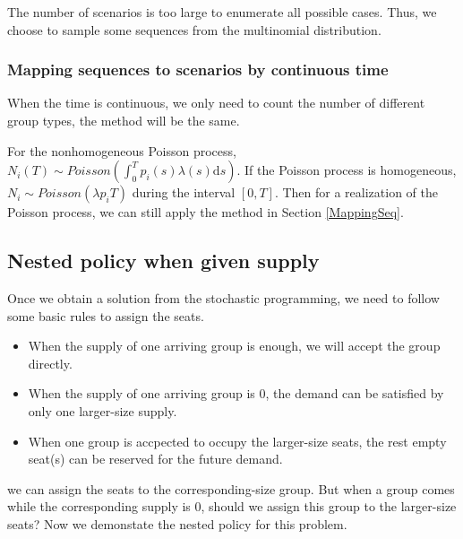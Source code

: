 The number of scenarios is too large to enumerate all possible cases.
Thus, we choose to sample some sequences from the multinomial distribution.



\subsubsection{Mapping sequences to scenarios by continuous time}

When the time is continuous, we only need to count the number of different group types, the method will be the same.

For the nonhomogeneous Poisson process, $N_{i}(T) \sim Poisson (\int_0^{T} p_i(s)\lambda(s) \mathrm{d} s)$. If the Poisson process is homogeneous, $N_{i} \sim Poisson(\lambda p_i T)$ during the interval $[0, T]$. Then for a realization of the Poisson process, we can still apply the method in Section \ref{MappingSeq}.

\subsection{Nested policy when given supply}\label{nested_policy}

Once we obtain a solution from the stochastic programming, we need to follow some basic rules to assign the seats.
\begin{itemize}
    \item When the supply of one arriving group is enough, we will accept the group directly.
    \item When the supply of one arriving group is 0, the demand can be satisfied by only one larger-size supply.
    \item When one group is accpected to occupy the larger-size seats, the rest empty seat(s) can be reserved for the future demand.
\end{itemize}

we can assign the seats to the corresponding-size group. But when a group comes while the corresponding supply is 0, should we assign this group to the larger-size seats? Now we demonstate the nested policy for this problem.

